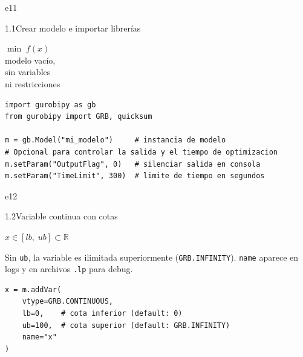 \documentclass[10pt,a4paper]{article}
\newlength{\mathcolw}
\newlength{\codecolw}
\newcommand{\entryheader}[2][]{%
  \needspace{5cm}%
  \vspace{6pt}%
  \ifx\relax#1\relax\else\phantomsection\hypertarget{#1}{}\fi%
  \noindent%
  \begin{tcolorbox}[
    colback=subsecbg!18,
    colframe=subsecbg!45,
    sharp corners, boxrule=0.4pt,
    left=5pt, right=5pt, top=2pt, bottom=2pt,
    fontupper=\small\bfseries\sffamily,
  ]
  #2
  \end{tcolorbox}%
  \vspace{2pt}%
}
\newcommand{\py}[1]{\texttt{\small #1}}
\begin{document}
\entryheader[e11]{1.1\quad Crear modelo e importar librer\'ias}
\noindent
\begin{minipage}[t]{\mathcolw}
    \begin{tcolorbox}[mathbox]
        $\min\; f(x)$\\[4pt]
        modelo vac\'io,\\ sin variables\\ ni restricciones
    \end{tcolorbox}
\end{minipage}\hspace{0.02\textwidth}%
\begin{minipage}[t]{\codecolw}
    \begin{lstlisting}[style=gurobipy]
import gurobipy as gb
from gurobipy import GRB, quicksum

m = gb.Model("mi_modelo")     # instancia de modelo
# Opcional para controlar la salida y el tiempo de optimizacion
m.setParam("OutputFlag", 0)   # silenciar salida en consola
m.setParam("TimeLimit", 300)  # limite de tiempo en segundos
    \end{lstlisting}
\end{minipage}

\vspace{4pt}

\entryheader[e12]{1.2\quad Variable continua con cotas}
\noindent
\begin{minipage}[t]{\mathcolw}
    \begin{tcolorbox}[mathbox]
        $x \in [lb,\; ub] \subset \mathbb{R}$
    \end{tcolorbox}
    \vspace{2pt}
    \begin{tcolorbox}[notebox]
        Sin \py{ub}, la variable es ilimitada superiormente (\py{GRB.INFINITY}). \py{name} aparece en logs y en archivos \py{.lp} para debug.
    \end{tcolorbox}
\end{minipage}\hspace{0.02\textwidth}%
\begin{minipage}[t]{\codecolw}
    \begin{lstlisting}[style=gurobipy]
x = m.addVar(
    vtype=GRB.CONTINUOUS,
    lb=0,    # cota inferior (default: 0)
    ub=100,  # cota superior (default: GRB.INFINITY)
    name="x"
)
    \end{lstlisting}
\end{minipage}

\vspace{4pt}
\end{document}
